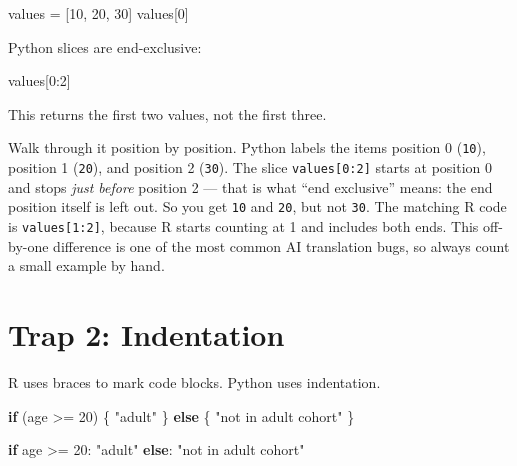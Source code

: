\documentclass[
  letterpaper,
  DIV=11,
  numbers=noendperiod,
  oneside]{scrreprt}
\newenvironment{Shaded}{\begin{snugshade}}{\end{snugshade}}
\newcommand{\CommentTok}[1]{\textcolor[rgb]{0.37,0.37,0.37}{#1}}
\newcommand{\ControlFlowTok}[1]{\textcolor[rgb]{0.00,0.23,0.31}{\textbf{#1}}}
\newcommand{\DecValTok}[1]{\textcolor[rgb]{0.68,0.00,0.00}{#1}}
\newcommand{\NormalTok}[1]{\textcolor[rgb]{0.00,0.23,0.31}{#1}}
\newcommand{\OperatorTok}[1]{\textcolor[rgb]{0.37,0.37,0.37}{#1}}
\newcommand{\SpecialCharTok}[1]{\textcolor[rgb]{0.37,0.37,0.37}{#1}}
\newcommand{\StringTok}[1]{\textcolor[rgb]{0.13,0.47,0.30}{#1}}
\begin{document}
\begin{Shaded}
\begin{Highlighting}[numbers=left,,]
\NormalTok{values }\OperatorTok{=}\NormalTok{ [}\DecValTok{10}\NormalTok{, }\DecValTok{20}\NormalTok{, }\DecValTok{30}\NormalTok{]}
\NormalTok{values[}\DecValTok{0}\NormalTok{]}
\end{Highlighting}
\end{Shaded}

Python slices are end-exclusive:

\begin{Shaded}
\begin{Highlighting}[numbers=left,,]
\NormalTok{values[}\DecValTok{0}\NormalTok{:}\DecValTok{2}\NormalTok{]}
\end{Highlighting}
\end{Shaded}

This returns the first two values, not the first three.

Walk through it position by position. Python labels the items position 0
(\texttt{10}), position 1 (\texttt{20}), and position 2 (\texttt{30}).
The slice \texttt{values{[}0:2{]}} starts at position 0 and stops
\emph{just before} position 2 --- that is what ``end exclusive'' means:
the end position itself is left out. So you get \texttt{10} and
\texttt{20}, but not \texttt{30}. The matching R code is
\texttt{values{[}1:2{]}}, because R starts counting at 1 and includes
both ends. This off-by-one difference is one of the most common AI
translation bugs, so always count a small example by hand.

\section{Trap 2: Indentation}\label{trap-2-indentation}

R uses braces to mark code blocks. Python uses indentation.

\begin{Shaded}
\begin{Highlighting}[numbers=left,,]
\ControlFlowTok{if}\NormalTok{ (age }\SpecialCharTok{\textgreater{}=} \DecValTok{20}\NormalTok{) \{}
  \StringTok{"adult"}
\NormalTok{\} }\ControlFlowTok{else}\NormalTok{ \{}
  \StringTok{"not in adult cohort"}
\NormalTok{\}}
\end{Highlighting}
\end{Shaded}

\begin{Shaded}
\begin{Highlighting}[numbers=left,,]
\ControlFlowTok{if}\NormalTok{ age }\OperatorTok{\textgreater{}=} \DecValTok{20}\NormalTok{:}
    \CommentTok{"adult"}
\ControlFlowTok{else}\NormalTok{:}
    \CommentTok{"not in adult cohort"}
\end{Highlighting}
\end{Shaded}
\end{document}
